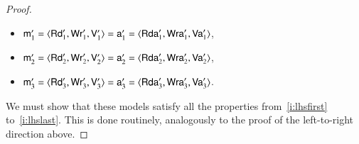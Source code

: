 \begin{proof}
\begin{itemize}
\item $\mathsf m'_1 = \langle \mathsf{Rd}'_1, \mathsf{Wr}'_1, \mathsf{V}'_1 \rangle = \mathsf a'_1 = \langle \mathsf {Rda}'_1, \mathsf {Wra}'_1, \mathsf {Va}'_1 \rangle$,
\item $\mathsf m'_2 = \langle \mathsf{Rd}'_2, \mathsf{Wr}'_2, \mathsf{V}'_2 \rangle = \mathsf a'_2 = \langle \mathsf {Rda}'_2, \mathsf {Wra}'_2, \mathsf {Va}'_2 \rangle$,
\item $\mathsf m'_3 = \langle \mathsf{Rd}'_3, \mathsf{Wr}'_3, \mathsf{V}'_3 \rangle = \mathsf a'_3 = \langle \mathsf {Rda}'_3, \mathsf {Wra}'_3, \mathsf {Va}'_3 \rangle$. 
\end{itemize}

We must show that these models satisfy all the properties from~\ref{i:lhsfirst} to~\ref{i:lhslast}. This is done routinely, analogously to the proof of the left-to-right direction above.
\end{proof}


